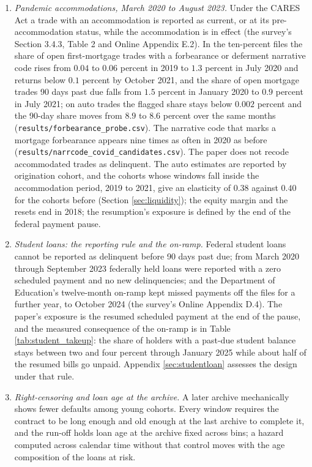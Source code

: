\begin{enumerate}[resume]
\item \emph{Pandemic accommodations, March 2020 to August 2023.} Under the CARES Act a trade with an accommodation is reported as current, or at its pre-accommodation status, while the accommodation is in effect (the survey's Section 3.4.3, Table 2 and Online Appendix E.2). In the ten-percent files the share of open first-mortgage trades with a forbearance or deferment narrative code rises from $0.04$ to $0.06$ percent in 2019 to $1.3$ percent in July 2020 and returns below $0.1$ percent by October 2021, and the share of open mortgage trades 90 days past due falls from $1.5$ percent in January 2020 to $0.9$ percent in July 2021; on auto trades the flagged share stays below $0.002$ percent and the 90-day share moves from $8.9$ to $8.6$ percent over the same months (\texttt{results/forbearance\_probe.csv}). The narrative code that marks a mortgage forbearance appears nine times as often in 2020 as before (\texttt{results/narrcode\_covid\_candidates.csv}). The paper does not recode accommodated trades as delinquent. The auto estimates are reported by origination cohort, and the cohorts whose windows fall inside the accommodation period, 2019 to 2021, give an elasticity of $0.38$ against $0.40$ for the cohorts before (Section \ref{sec:liquidity}); the equity margin and the resets end in 2018; the resumption's exposure is defined by the end of the federal payment pause.

\item \emph{Student loans: the reporting rule and the on-ramp.} Federal student loans cannot be reported as delinquent before 90 days past due; from March 2020 through September 2023 federally held loans were reported with a zero scheduled payment and no new delinquencies; and the Department of Education's twelve-month on-ramp kept missed payments off the files for a further year, to October 2024 (the survey's Online Appendix D.4). The paper's exposure is the resumed scheduled payment at the end of the pause, and the measured consequence of the on-ramp is in Table \ref{tab:student_takeup}: the share of holders with a past-due student balance stays between two and four percent through January 2025 while about half of the resumed bills go unpaid. Appendix \ref{sec:studentloan} assesses the design under that rule.

\item \emph{Right-censoring and loan age at the archive.} A later archive mechanically shows fewer defaults among young cohorts. Every window requires the contract to be long enough and old enough at the last archive to complete it, and the run-off holds loan age at the archive fixed across bins; a hazard computed across calendar time without that control moves with the age composition of the loans at risk.


\end{enumerate}
